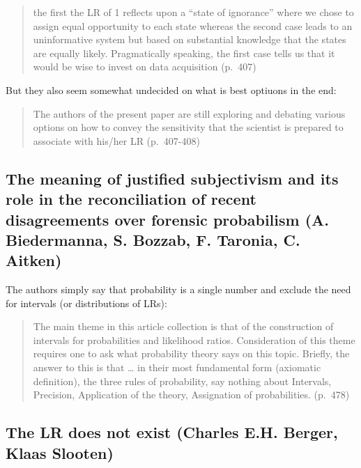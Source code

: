 \documentclass[
  10pt,
  dvipsnames,enabledeprecatedfontcommands]{scrartcl}
\begin{document}
\begin{quote}
the first the LR of 1 reflects upon a ``state of ignorance'' where we
chose to assign equal opportunity to each state whereas the second case
leads to an uninformative system but based on substantial knowledge that
the states are equally likely. Pragmatically speaking, the first case
tells us that it would be wise to invest on data acquisition (p.~407)
\end{quote}

\noindent But they also seem somewhat undecided on what is best optiuons
in the end:

\begin{quote}
The authors of the present paper are still exploring and debating
various options on how to convey the sensitivity that the scientist is
prepared to associate with his/her LR (p.~407-408)
\end{quote}

\hypertarget{the-meaning-of-justified-subjectivism-and-its-role-in-the-reconciliation-of-recent-disagreements-over-forensic-probabilism-a.-biedermanna-s.-bozzab-f.-taronia-c.-aitken}{%
\subsection{The meaning of justified subjectivism and its role in the
reconciliation of recent disagreements over forensic probabilism (A.
Biedermanna, S. Bozzab, F. Taronia, C.
Aitken)}\label{the-meaning-of-justified-subjectivism-and-its-role-in-the-reconciliation-of-recent-disagreements-over-forensic-probabilism-a.-biedermanna-s.-bozzab-f.-taronia-c.-aitken}}

The authors simply say that probability is a single number and exclude
the need for intervals (or distributions of LRs):

\begin{quote}
The main theme in this article collection is that of the construction of
intervals for probabilities and likelihood ratios. Consideration of this
theme requires one to ask what probability theory says on this topic.
Briefly, the answer to this is that \ldots{} in their most fundamental
form (axiomatic definition), the three rules of probability, say nothing
about Intervals, Precision, Application of the theory, Assignation of
probabilities. (p.~478)
\end{quote}

\hypertarget{the-lr-does-not-exist-charles-e.h.-berger-klaas-slooten}{%
\subsection{The LR does not exist (Charles E.H. Berger, Klaas
Slooten)}\label{the-lr-does-not-exist-charles-e.h.-berger-klaas-slooten}}
\end{document}
